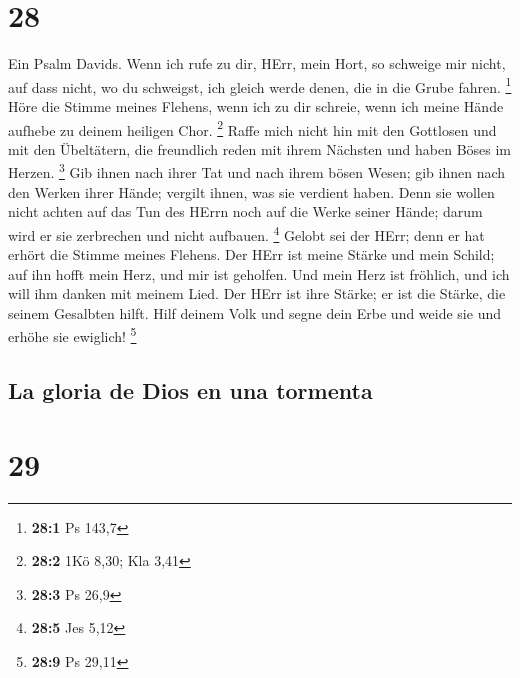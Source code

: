 \hypertarget{section-27}{%
\section{28}\label{section-27}}

 Ein Psalm Davids. Wenn ich rufe zu dir, HErr, mein Hort,
so schweige mir nicht, auf dass nicht, wo du schweigst, ich gleich werde
denen, die in die Grube fahren. \footnote{\textbf{28:1} Ps 143,7}
 Höre die Stimme meines Flehens, wenn ich zu dir schreie,
wenn ich meine Hände aufhebe zu deinem heiligen Chor. \footnote{\textbf{28:2}
  1Kö 8,30; Kla 3,41}  Raffe mich nicht hin mit den
Gottlosen und mit den Übeltätern, die freundlich reden mit ihrem
Nächsten und haben Böses im Herzen. \footnote{\textbf{28:3} Ps 26,9}
 Gib ihnen nach ihrer Tat und nach ihrem bösen Wesen; gib
ihnen nach den Werken ihrer Hände; vergilt ihnen, was sie verdient
haben.  Denn sie wollen nicht achten auf das Tun des HErrn
noch auf die Werke seiner Hände; darum wird er sie zerbrechen und nicht
aufbauen. \footnote{\textbf{28:5} Jes 5,12}  Gelobt sei
der HErr; denn er hat erhört die Stimme meines Flehens. 
Der HErr ist meine Stärke und mein Schild; auf ihn hofft mein Herz, und
mir ist geholfen. Und mein Herz ist fröhlich, und ich will ihm danken
mit meinem Lied.  Der HErr ist ihre Stärke; er ist die
Stärke, die seinem Gesalbten hilft.  Hilf deinem Volk und
segne dein Erbe und weide sie und erhöhe sie ewiglich! \footnote{\textbf{28:9}
  Ps 29,11}

\hypertarget{la-gloria-de-dios-en-una-tormenta}{%
\subsection{La gloria de Dios en una
tormenta}\label{la-gloria-de-dios-en-una-tormenta}}

\hypertarget{section-28}{%
\section{29}\label{section-28}}

